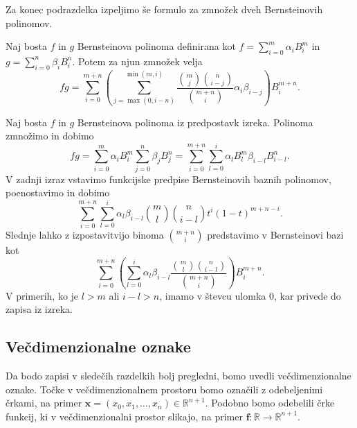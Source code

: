 \documentclass[isrm2, tisk]{fmfdelo}
\newcommand{\R}{\mathbb R}
\begin{document}
    Za konec podrazdelka izpeljimo še formulo za zmnožek dveh Bernsteinovih polinomov.
    \begin{izrek}
        \label{izrek:bernstein-multiplication}
        Naj bosta $f$ in $g$ Bernsteinova polinoma definirana kot $f=\sum_{i=0}^{m}\alpha_iB_i^m$ in $g=\sum_{i=0}^{n}\beta_iB_i^n$.
        Potem za njun zmnožek velja
        \[ fg = \sum_{i=0}^{m+n}\left(\sum_{j=\max(0,i-n)}^{\min(m,i)} \frac{\binom{m}{j}\binom{n}{i-j}}{\binom{m+n}{i}} \alpha_i\beta_{i-j} \right)B_{i}^{m+n}.\]
    \end{izrek}
    \begin{dokaz}
        Naj bosta $f$ in $g$ Bernsteinova polinoma iz predpostavk izreka.
        Polinoma zmnožimo in dobimo
        \[fg =\sum_{i=0}^{m}\alpha_iB_{i}^{m}\sum_{j=0}^{n}\beta_jB_{j}^{n} = \sum_{i=0}^{m+n}\sum_{l=0}^i \alpha_lB_{l}^{m}\beta_{i-l}B_{i-l}^{n}. \]
        V zadnji izraz vstavimo funkcijske predpise Bernsteinovih baznih polinomov, poenostavimo in dobimo
        \[\sum_{i=0}^{m+n}\sum_{l=0}^i \alpha_l \beta_{i-l} \binom{m}{l}\binom{n}{i-l}t^{i}(1-t)^{m+n-i}.\]
        Slednje lahko z izpostavitvijo binoma $\binom{m+n}{i}$ predstavimo v Bernsteinovi bazi kot
        \[\sum_{i=0}^{m+n} \left(\sum_{l=0}^i  \alpha_l \beta_{i-l}\frac{\binom{m}{l}\binom{n}{i-l}}{\binom{m+n}{i}}\right) B_{i}^{m+n}.\]
        V primerih, ko je $l>m$ ali $i-l>n$, imamo v števcu ulomka $0$, kar privede do zapisa iz izreka.
    \end{dokaz}

    \subsection{Večdimenzionalne oznake}
    Da bodo zapisi v sledečih razdelkih bolj pregledni, bomo uvedli večdimenzionalne oznake.
    Točke v večdimenzionalnem prostoru bomo označili z odebeljenimi črkami, na primer $\mathbf{x}=(x_0,x_1,\dots,x_n)\in\R^{n+1}$.
    Podobno bomo odebelili črke funkcij, ki v večdimenzionalni prostor slikajo, na primer $\mathbf{f}:\R\to\R^{n+1}$.
\end{document}
